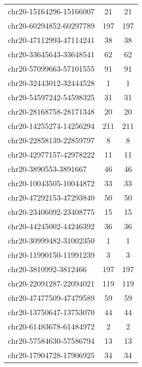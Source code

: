 \begin{longtable}{lSS}
	chr20-15164296-15166007 & 21     & 21                          \\
	chr20-60294852-60297789 & 197    & 197                         \\
	chr20-47112993-47114241 & 38     & 38                          \\
	chr20-33645643-33648541 & 62     & 62                          \\
	chr20-57099663-57101555 & 91     & 91                          \\
	chr20-32443012-32444528 & 1      & 1                           \\
	chr20-54597242-54598325 & 31     & 31                          \\
	chr20-28168758-28171348 & 20     & 20                          \\
	chr20-14255274-14256294 & 211    & 211                         \\
	chr20-22858139-22859797 & 8      & 8                           \\
	chr20-42977157-42978222 & 11     & 11                          \\
	chr20-3890553-3891667   & 46     & 46                          \\
	chr20-10043505-10044872 & 33     & 33                          \\
	chr20-47292153-47293840 & 50     & 50                          \\
	chr20-23406092-23408775 & 15     & 15                          \\
	chr20-44245002-44246392 & 36     & 36                          \\
	chr20-30999482-31002350 & 1      & 1                           \\
	chr20-11990150-11991239 & 3      & 3                           \\
	chr20-3810992-3812466   & 197    & 197                         \\
	chr20-22091287-22094021 & 119    & 119                         \\
	chr20-47477509-47479589 & 59     & 59                          \\
	chr20-13750647-13753070 & 44     & 44                          \\
	chr20-61483678-61484972 & 2      & 2                           \\
	chr20-57584630-57586794 & 13     & 13                          \\
	chr20-17904728-17906925 & 34     & 34                          \\

\end{longtable}
